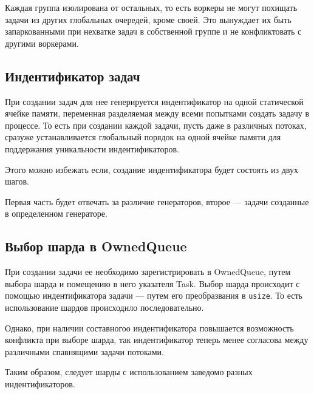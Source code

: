 Каждая группа изолирована от остальных, то есть воркеры не могут похищать задачи из других глобальных очередей, кроме своей. Это вынуждает их быть запаркованными при нехватке задач в собственной группе и не конфликтовать с другими воркерами.

\subsection{Индентификатор задач}

При создании задач для нее генерируется индентификатор на одной статической ячейке памяти, переменная разделяемая между всеми попытками создать задачу в процессе. То есть при создании каждой задачи, пусть даже в различных потоках, сразуже устанавливается глобальный порядок на одной ячейке памяти для поддержания уникальности индентификаторов.

Этого можно избежать если, создание индентификатора будет состоять из двух шагов.

Первая часть будет отвечать за различие генераторов, второе --- задачи созданные в определенном генераторе.

\subsection{Выбор шарда в OwnedQueue}

При создании задачи ее необходимо зарегистрировать в OwnedQueue, путем выбора шарда и помещению в него указателя Task. Выбор шарда происходит с помощью индентификатора задачи --- путем его преобразвания в \verb|usize|. То есть использование шардов происходило последовательно.

Однако, при наличии составногоо индентификатора повышается возможность конфликта при выборе шарда, так индентификатор теперь менее согласова между различными спавнящими задачи потоками.

Таким образом, следует шарды с использованием заведомо разных индентификаторов.
